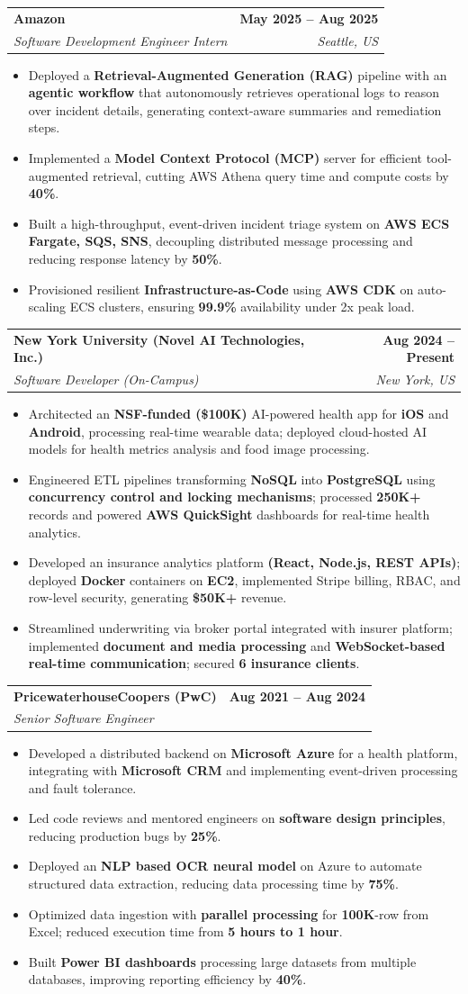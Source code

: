 \documentclass[letterpaper,10pt]{article}
\makeatletter
\newcommand{\resumeItem}[1]{
\item\small{{#1}\vspace{-3.5pt}}
}
\newcommand{\resumeSubheading}[4]{
\vspace{6pt}
\item
\begin{tabular*}{1.0\textwidth}[t]{l@{\extracolsep{\fill}}r}
\textbf{#1} & \textbf{\small #2} \\
\textit{\small#3} & \textit{\small #4} \\
\end{tabular*}\vspace{-5.5pt}
}
\newcommand{\resumeItemListStart}{\begin{itemize}[leftmargin=*, itemsep=0pt, topsep=0pt]}
\newcommand{\resumeItemListEnd}{\end{itemize}\vspace{-3pt}}
\makeatother
\begin{document}
\resumeSubheading
  {Amazon}{May 2025 -- Aug 2025}
  {Software Development Engineer Intern}{Seattle, US}
\resumeItemListStart
  \resumeItem{Deployed a \textbf{Retrieval-Augmented Generation (RAG)} pipeline with an \textbf{agentic workflow} that autonomously retrieves operational logs to reason over incident details, generating context-aware summaries and remediation steps.}
  \resumeItem{Implemented a \textbf{Model Context Protocol (MCP)} server for efficient tool-augmented retrieval, cutting AWS Athena query time and compute costs by \textbf{40\%}.}
  \resumeItem{Built a high-throughput, event-driven incident triage system on \textbf{AWS ECS Fargate, SQS, SNS}, decoupling distributed message processing and reducing response latency by \textbf{50\%}.}
  \resumeItem{Provisioned resilient \textbf{Infrastructure-as-Code} using \textbf{AWS CDK} on auto-scaling ECS clusters, ensuring \textbf{99.9\%} availability under 2x peak load.}
\resumeItemListEnd

\resumeSubheading
  {New York University (Novel AI Technologies, Inc.)}{Aug 2024 -- Present}
  {Software Developer (On-Campus)}{New York, US}
\resumeItemListStart
  \resumeItem{Architected an \textbf{NSF-funded (\$100K)} AI-powered health app for \textbf{iOS} and \textbf{Android}, processing real-time wearable data; deployed cloud-hosted AI models for health metrics analysis and food image processing.}
  \resumeItem{Engineered ETL pipelines transforming \textbf{NoSQL} into \textbf{PostgreSQL} using \textbf{concurrency control and locking mechanisms}; processed \textbf{250K+} records and powered \textbf{AWS QuickSight} dashboards for real-time health analytics.}
  \resumeItem{Developed an insurance analytics platform \textbf{(React, Node.js, REST APIs)}; deployed \textbf{Docker} containers on \textbf{EC2}, implemented Stripe billing, RBAC, and row-level security, generating \textbf{\$50K+} revenue.}
  \resumeItem{Streamlined underwriting via broker portal integrated with insurer platform; implemented \textbf{document and media processing} and \textbf{WebSocket-based real-time communication}; secured \textbf{6 insurance clients}.}
\resumeItemListEnd

\resumeSubheading
  {PricewaterhouseCoopers (PwC)}{Aug 2021 -- Aug 2024}
  {Senior Software Engineer}{}
\resumeItemListStart
  \resumeItem{Developed a distributed backend on \textbf{Microsoft Azure} for a health platform, integrating with \textbf{Microsoft CRM} and implementing event-driven processing and fault tolerance.}
  \resumeItem{Led code reviews and mentored engineers on \textbf{software design principles}, reducing production bugs by \textbf{25\%}.}
  \resumeItem{Deployed an \textbf{NLP based OCR neural model} on Azure to automate structured data extraction, reducing data processing time by \textbf{75\%}.}
  \resumeItem{Optimized data ingestion with \textbf{parallel processing} for \textbf{100K}-row from Excel; reduced execution time from \textbf{5 hours to 1 hour}.}
  \resumeItem{Built \textbf{Power BI dashboards} processing large datasets from multiple databases, improving reporting efficiency by \textbf{40\%}.}
\resumeItemListEnd
\end{document}
